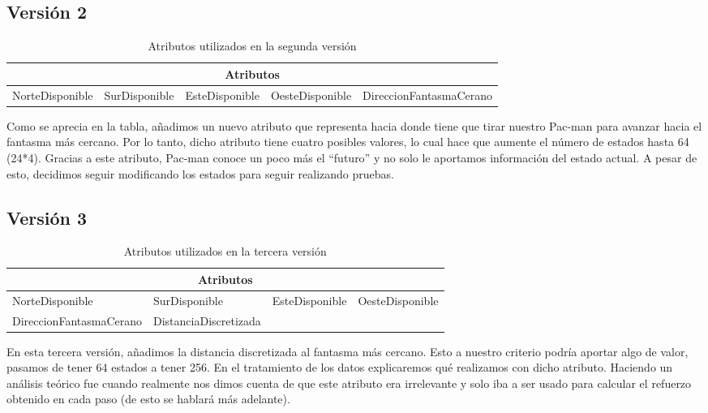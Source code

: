 \documentclass[11pt,a4paper]{article}
\begin{document}
\subsection{Versión 2}

\begin{table}[H]
\centering
\label{atributosV2}
\begin{tabular}{|l|l|l|l|l|}
\hline
\multicolumn{5}{|c|}{\textbf{Atributos}}                                                     \\ \hline
NorteDisponible & SurDisponible & EsteDisponible & OesteDisponible & DireccionFantasmaCerano \\ \hline
\end{tabular}
\caption{Atributos utilizados en la segunda versión}
\end{table}

Como se aprecia en la tabla, añadimos un nuevo atributo que representa hacia donde tiene que tirar nuestro Pac-man para avanzar hacia el fantasma más cercano. Por lo tanto, dicho atributo tiene cuatro posibles valores, lo cual hace que aumente el número de estados hasta 64 (24*4). 
Gracias a este atributo, Pac-man conoce un poco más el “futuro” y no solo le aportamos información del estado actual. A pesar de esto, decidimos seguir modificando los estados para seguir realizando pruebas.

\subsection{Versión 3}

\begin{table}[H]
\centering
\label{AtributosV3}
\begin{tabular}{|l|l|ll}
\hline
\multicolumn{4}{|c|}{\textbf{Atributos}} \\ \hline
NorteDisponible & SurDisponible & \multicolumn{1}{l|}{EsteDisponible} & \multicolumn{1}{l|}{OesteDisponible} \\ \hline
DireccionFantasmaCerano & DistanciaDiscretizada &  &  \\ \cline{1-2}
\end{tabular}
\caption{Atributos utilizados en la tercera versión}
\end{table}
En esta tercera versión, añadimos la distancia discretizada al fantasma más cercano. Esto a nuestro criterio podría aportar algo de valor, pasamos de tener 64 estados a tener 256. En el tratamiento de los datos explicaremos qué realizamos con dicho atributo.
Haciendo un análisis teórico fue cuando realmente nos dimos cuenta de que este atributo era irrelevante y solo iba a ser usado para calcular el refuerzo obtenido en cada paso (de esto se hablará más adelante).
\end{document}
